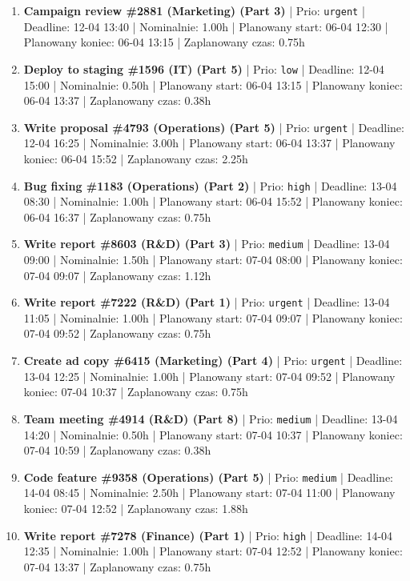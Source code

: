 {\begin{enumerate}
  \item [\textbf{14599}] \textbf{Campaign review \#2881 (Marketing) (Part 3)} | Prio: \texttt{urgent} | Deadline: 12-04 13:40 | Nominalnie: 1.00h | Planowany start: 06-04 12:30 | Planowany koniec: 06-04 13:15 | Zaplanowany czas: 0.75h
  \item [\textbf{14692}] \textbf{Deploy to staging \#1596 (IT) (Part 5)} | Prio: \texttt{low} | Deadline: 12-04 15:00 | Nominalnie: 0.50h | Planowany start: 06-04 13:15 | Planowany koniec: 06-04 13:37 | Zaplanowany czas: 0.38h
  \item [\textbf{14600}] \textbf{Write proposal \#4793 (Operations) (Part 5)} | Prio: \texttt{urgent} | Deadline: 12-04 16:25 | Nominalnie: 3.00h | Planowany start: 06-04 13:37 | Planowany koniec: 06-04 15:52 | Zaplanowany czas: 2.25h
  \item [\textbf{14613}] \textbf{Bug fixing \#1183 (Operations) (Part 2)} | Prio: \texttt{high} | Deadline: 13-04 08:30 | Nominalnie: 1.00h | Planowany start: 06-04 15:52 | Planowany koniec: 06-04 16:37 | Zaplanowany czas: 0.75h
  \item [\textbf{14634}] \textbf{Write report \#8603 (R\&D) (Part 3)} | Prio: \texttt{medium} | Deadline: 13-04 09:00 | Nominalnie: 1.50h | Planowany start: 07-04 08:00 | Planowany koniec: 07-04 09:07 | Zaplanowany czas: 1.12h
  \item [\textbf{14601}] \textbf{Write report \#7222 (R\&D) (Part 1)} | Prio: \texttt{urgent} | Deadline: 13-04 11:05 | Nominalnie: 1.00h | Planowany start: 07-04 09:07 | Planowany koniec: 07-04 09:52 | Zaplanowany czas: 0.75h
  \item [\textbf{14602}] \textbf{Create ad copy \#6415 (Marketing) (Part 4)} | Prio: \texttt{urgent} | Deadline: 13-04 12:25 | Nominalnie: 1.00h | Planowany start: 07-04 09:52 | Planowany koniec: 07-04 10:37 | Zaplanowany czas: 0.75h
  \item [\textbf{14638}] \textbf{Team meeting \#4914 (R\&D) (Part 8)} | Prio: \texttt{medium} | Deadline: 13-04 14:20 | Nominalnie: 0.50h | Planowany start: 07-04 10:37 | Planowany koniec: 07-04 10:59 | Zaplanowany czas: 0.38h
  \item [\textbf{14661}] \textbf{Code feature \#9358 (Operations) (Part 5)} | Prio: \texttt{medium} | Deadline: 14-04 08:45 | Nominalnie: 2.50h | Planowany start: 07-04 11:00 | Planowany koniec: 07-04 12:52 | Zaplanowany czas: 1.88h
  \item [\textbf{14609}] \textbf{Write report \#7278 (Finance) (Part 1)} | Prio: \texttt{high} | Deadline: 14-04 12:35 | Nominalnie: 1.00h | Planowany start: 07-04 12:52 | Planowany koniec: 07-04 13:37 | Zaplanowany czas: 0.75h

\end{enumerate}}
